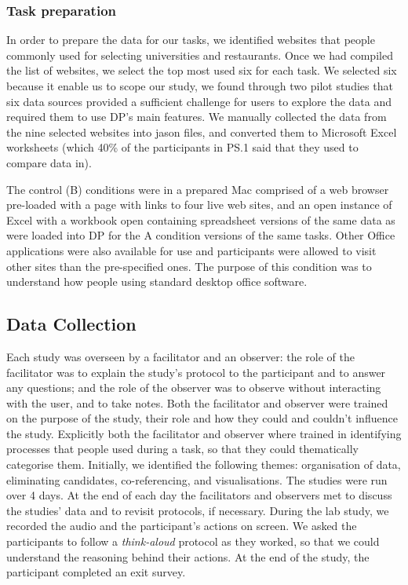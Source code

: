 \documentclass{sigchi}
\begin{document}
\subsubsection{Task preparation}
In order to prepare the data for our tasks, we identified websites that people commonly used for selecting universities and restaurants.  Once we had compiled the list of websites, we select the top most used six for each task.  We selected six because it enable us to scope our study, we found through two pilot studies that six data sources provided a sufficient challenge for users to explore the data and required them to use DP's main features.  We manually collected the data from the nine selected websites into jason files, and converted them to Microsoft Excel worksheets (which 40\% of the participants in PS.1 said that they used to compare data in).

The control (B) conditions were in a prepared Mac comprised of a web browser pre-loaded with a page with links to four live web sites, and an open instance of Excel with a workbook open containing spreadsheet versions of the same data as were loaded into DP for the A condition versions of the same tasks.  Other Office applications were also available for use and participants were allowed to visit other sites than the pre-specified ones.  The purpose of this condition was to understand how people using standard desktop office software.

\subsection{Data Collection}
Each study was overseen by a facilitator and an observer:  the role of the facilitator was to explain the study's protocol to the participant and to answer any questions; and the role of the observer was to observe without interacting with the user, and to take notes.  Both the facilitator and observer were trained on the purpose of the study, their role and how they could and couldn't influence the study.   Explicitly both the facilitator and observer where trained in identifying processes that people used during a task, so that they could thematically categorise them.  Initially, we identified the following themes: organisation of data, eliminating candidates, co-referencing, and visualisations. The studies were run over 4 days.  At the end of each day the facilitators and observers met to discuss the studies' data and to revisit protocols, if necessary.  During the lab study, we recorded the audio and the participant's actions on screen. We asked the participants to follow a \emph{think-aloud} protocol as they worked, so that we could understand the reasoning behind their actions.  At the end of the study, the participant completed an exit survey.   
\end{document}
